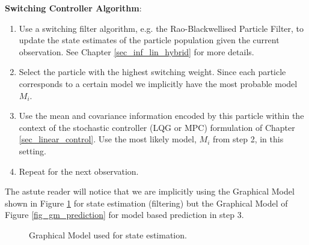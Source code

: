 \textbf{Switching Controller Algorithm}:
\begin{enumerate}
\item
Use a switching filter algorithm, e.g. the Rao-Blackwellised Particle Filter, to update the state estimates of the particle population given the current observation. See Chapter \ref{sec_inf_lin_hybrid} for more details.
\item
Select the particle with the highest switching weight. Since each particle corresponds to a certain model we implicitly have the most probable model $M_i$.
\item
Use the mean and covariance information encoded by this particle within the context of the stochastic controller (LQG or MPC) formulation of Chapter \ref{sec_linear_control}. Use the most likely model, $M_i$ from step 2, in this setting.
\item
Repeat for the next observation. 
\end{enumerate} 
The astute reader will notice that we are implicitly using the Graphical Model shown in Figure \ref{fig_gm_filter} for state estimation (filtering) but the Graphical Model of Figure \ref{fig_gm_prediction} for model based prediction in step 3.
\begin{figure}[H] 
\centering
{}
\caption{Graphical Model used for state estimation.}
\label{fig_gm_filter}
\end{figure}
